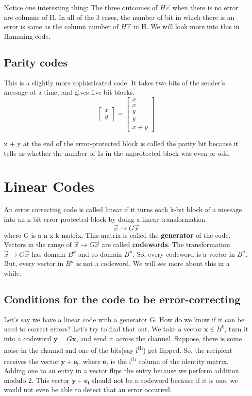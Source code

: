 \documentclass[11pt,a4paper]{article}
\begin{document}
Notice one interesting thing: The three outcomes of $H\Vec{c}$ when there is no error are columns of H. In all of the 3 cases, the number of bit in which there is an error is same as the column number of $H\Vec{c}$ in H. We will look more into this in Hamming code.

\subsection{Parity codes}
This is a slightly more sophisticated code. It takes two bits of the sender's message at a time, and gives five bit blocks.
$$
    \begin{bmatrix}
        x\\y
    \end{bmatrix}
     = 
    \begin{bmatrix}
        x\\x\\y\\y\\x + y
        
    \end{bmatrix}
$$

x + y at the end of the error-protected block is called the parity bit because it tells us whether the number of 1s in the unprotected block was even or odd. 

\section{Linear Codes}
An error correcting code is called linear if it turns each k-bit block of a message into an n-bit error protected block by doing a linear transformation
$$ \vec{x} \to G\vec{x} $$
where G is a n x k matrix. This matrix is called the \textbf{generator} of the code. Vectors in the range of $ \vec{x} \to G\vec{x} $ are called \textbf{codewords}. The transformation $ \vec{x} \to G\vec{x} $ has domain $B^k$ and co-domain $B^n$. So, every codeword is a vector in $B^n$. But, every vector in $B^n$ is not a codeword. We will see more about this in a while. 

\subsection{Conditions for the code to be error-correcting}
Let's say we have a linear code with a generator G. How do we know if it can be used to correct errors? Let's try to find that out. We take a vector $\mathbf{x} \in B^k$, turn it into a codeword $\mathbf{y} = G\mathbf{x}$, and send it across the channel. Suppose, there is some noise in the channel and one of the bits(say i\textsuperscript{th}) get flipped. So, the recipient receives the vector $\mathbf{y} + \mathbf{e_{i}}$, where $\mathbf{e_i}$ is the i\textsuperscript{th} column of the identity matrix. Adding one to an entry in a vector flips the entry because we perform addition modulo 2. This vector $\mathbf{y} + \mathbf{e_{i}}$ should not be a codeword because if it is one, we would not even be able to detect that an error occurred.
\end{document}
